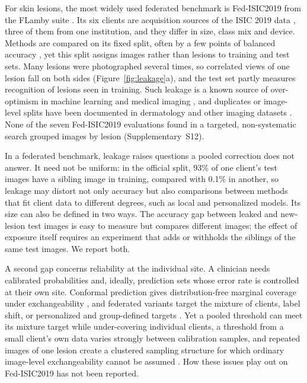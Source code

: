 For skin lesions, the most widely used federated benchmark is Fed-ISIC2019 from the FLamby suite
\cite{flamby2022}. Its six clients are acquisition sources of the ISIC 2019 data
\cite{codella2018isic,tschandl2018ham,combalia2019bcn}, three of them from one institution, and they differ
in size, class mix and device. Methods are compared on its fixed split, often by a few points of balanced
accuracy \cite{flamby2022,tavakoli2024fendafl}, yet this split assigns images rather than lesions to
training and test sets. Many lesions were photographed several times, so correlated views of one lesion
fall on both sides (Figure~\ref{fig:leakage}a), and the test set partly measures recognition of lesions
seen in training. Such leakage is a known source of over-optimism in machine learning and medical imaging
\cite{kapoor2023leakage,varoquaux2022failures,roberts2021pitfalls}, and duplicates or image-level splits
have been documented in dermatology and other imaging datasets
\cite{cassidy2022isic,groger2023reliable,abhishek2025dermamnist,bussola2021tiles,yagis2021leakage}. None of the seven Fed-ISIC2019 evaluations found in a targeted, non-systematic search grouped images by lesion (Supplementary~S12).

In a federated benchmark, leakage raises questions a pooled correction does not answer. It need not be
uniform: in the official split, 93\% of one client's test images have a sibling image in training,
compared with 0.1\% in another, so leakage may distort not only accuracy but also comparisons between
methods that fit client data to different degrees, such as local and personalized models. Its size can
also be defined in two ways. The accuracy gap between leaked and new-lesion test images is easy to measure
but compares different images; the effect of exposure itself requires an experiment that adds or
withholds the siblings of the same test images. We report both.

A second gap concerns reliability at the individual site. A clinician needs calibrated probabilities
\cite{guo2017calibration} and, ideally, prediction sets whose error rate is controlled at their own site.
Conformal prediction gives distribution-free marginal coverage under exchangeability
\cite{vovk2005algorithmic,angelopoulos2023gentle}, and federated variants target the mixture of clients,
label shift, or personalized and group-defined targets
\cite{lu2023fcp,humbert2023oneshot,plassier2023labelshift,min2025pfcp,wen2026gcfcp}. Yet a pooled
threshold can meet its mixture target while under-covering individual clients, a threshold from a small
client's own data varies strongly between calibration samples, and repeated images of one lesion create a clustered sampling structure for which ordinary image-level exchangeability cannot be assumed
\cite{lee2023hierarchical,dunn2022hierarchical}. How these issues play out on Fed-ISIC2019 has not been reported.


